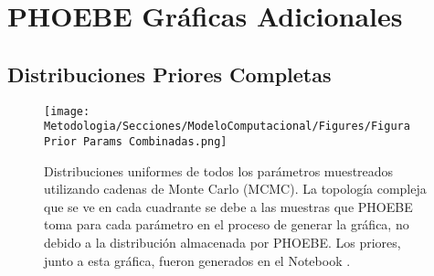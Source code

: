\chapter{PHOEBE Gráficas Adicionales} \label{apendice:modelo_computacional_graficas}

\section{Distribuciones Priores Completas} \label{apendice:modelo_computacional_graficas:dist_priores_completas}

\begin{figure}[!ht]
    \centering
    \texttt{[image: Metodologia/Secciones/ModeloComputacional/Figures/Figura Prior Params Combinadas.png]}
    \caption{Distribuciones uniformes de todos los parámetros muestreados
    utilizando cadenas de Monte Carlo (MCMC). La topología compleja que se ve en
    cada cuadrante se debe a las muestras que PHOEBE toma para cada parámetro en
    el proceso de generar la gráfica, no debido a la distribución almacenada por
    PHOEBE. Los priores, junto a esta gráfica, fueron generados en el Notebook
    \href{https://github.com/KnightIV/UANL_MAPTA_Observaciones/blob/main/analisis/phoebe_model/sampling/updated-data-mcmc-sampling.ipynb}{}.}
    \label{figuraPhoebePrioresCombinadasZtf}
\end{figure}